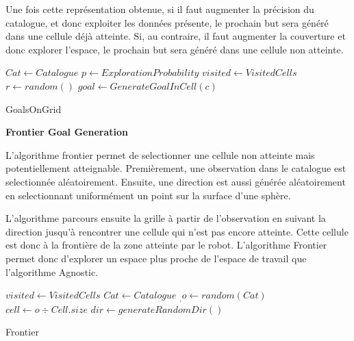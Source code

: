 \documentclass[11pt,french]{report}
\begin{document}
\phantom{INVISIBLE LINE}

Une fois cette représentation obtenue, si il faut augmenter la précision du catalogue, et donc exploiter les données présente, le prochain but sera généré dans une cellule déjà atteinte.
Si, au contraire, il faut augmenter la couverture et donc explorer l'espace, le prochain but sera généré dans une cellule non atteinte.

\begin{algorithm}[h]
    \DontPrintSemicolon
    \LinesNumbered
    $Cat \leftarrow Catalogue$ \;
    $p \leftarrow ExplorationProbability$ \;
    $visited \leftarrow VisitedCells$ \;
    $r \leftarrow random()$ \;
    $goal \leftarrow GenerateGoalInCell(c)$ \;
    \caption{\label{alg:GoalsOnGrid} GoalsOnGrid}
\end{algorithm}

\pagebreak

\textbf{Frontier Goal Generation}

\phantom{INVISIBLE LINE}

L'algorithme frontier permet de selectionner une cellule non atteinte mais potentiellement atteignable.
Premièrement, une observation dans le catalogue est selectionnée aléatoirement.
Ensuite, une direction est aussi générée aléatoirement en selectionnant uniformément un point sur la surface d'une sphère.

L'algorithme parcours ensuite la grille à partir de l'observation en suivant la direction jusqu'à rencontrer une cellule qui n'est pas encore atteinte.
Cette cellule est donc à la frontière de la zone atteinte par le robot.
L'algorithme Frontier permet donc d'explorer un espace plus proche de l'espace de travail que l'algorithme Agnostic.

\begin{algorithm}[h]
    \DontPrintSemicolon
    \LinesNumbered
    $visited \leftarrow VisitedCells$ \;
    $Cat \leftarrow Catalogue$ \;
    $_, o \leftarrow random(Cat)$ \;
    $cell \leftarrow o \div Cell.size$ \;
    $dir \leftarrow generateRandomDir()$ \;
    \caption{\label{alg:Frontier} Frontier}
\end{algorithm}


\end{document}
